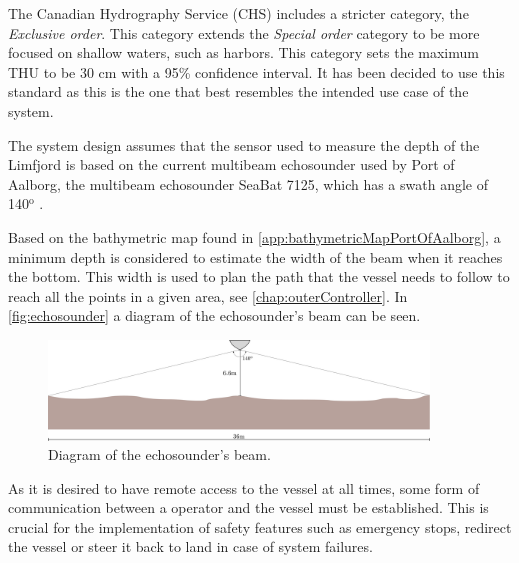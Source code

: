 The Canadian Hydrography Service (CHS) includes a stricter category, the \emph{Exclusive order}. 
This category extends the \emph{Special order} category to be more focused on shallow waters, such as harbors. 
This category sets the maximum THU to be 30 cm with a 95\% confidence interval. 
It has been decided to use this standard as this is the one that best resembles the intended use case of the system. \cite{CHS}

The system design assumes that the sensor used to measure the depth of the Limfjord is based on the current multibeam echosounder used by Port of Aalborg, the multibeam echosounder SeaBat 7125, which has a swath angle of 140$^\mathrm{o}$ \cite{echoSounder}.

Based on the bathymetric map found in \autoref{app:bathymetricMapPortOfAalborg}, a minimum depth is considered to estimate the width of the beam when it reaches the bottom. This width is used to plan the path that the vessel needs to follow to reach all the points in a given area, see \autoref{chap:outerController}. In \autoref{fig:echosounder} a diagram of the echosounder's beam can be seen.

\begin{figure}[H]
    \includegraphics[width=0.9\textwidth]{figures/echosounder}
    \caption{Diagram of the echosounder's beam.}
    \label{fig:echosounder}
\end{figure}

As it is desired to have remote access to the vessel at all times, some form of communication between a operator and the vessel must be established. This is crucial for the implementation of safety features such as emergency stops, redirect the vessel or steer it back to land in case of system failures.

